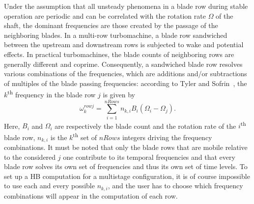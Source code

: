 Under the assumption that all unsteady phenomena in a blade row during
stable operation are periodic and can be correlated with the rotation
rate $\Omega$ of the shaft, the dominant frequencies are those created
by the passage of the neighboring blades. In a multi-row turbomachine,
a blade row sandwiched between the upstream and downstream rows is
subjected to wake and potential effects. In practical turbomachines,
the blade counts of neighboring rows are generally different and
coprime. Consequently, a sandwiched blade row resolves various
combinations of the frequencies, which are additions and/or
subtractions of multiples of the blade passing frequencies: according
to Tyler and Sofrin~\cite{Tyler1962}, the $k$\textsuperscript{th}
frequency in the blade row $j$ is given by
\begin{equation}
  \omega_k^{rowj} = \sum_{i=1}^{nRows} n_{k,i}B_i(\Omega_i-\Omega_j).
   \label{eq:calcFreq}
\end{equation}
Here, $B_i$ and $\Omega_i$ are respectively the blade count and the
rotation rate of the $i$\textsuperscript{th} blade row, $n_{k,i}$
is the $k$\textsuperscript{th} set of $nRows$ integers driving the frequency combinations. It must
be noted that only the blade rows that are mobile relative to the
considered $j$ one contribute to its temporal frequencies and that
every blade row solves its own set of frequencies and thus its own set
of time levels.  To set up a HB computation for a multistage
configuration, it is of course impossible to use each and every 
possible $n_{k,i}$, and the user has to choose which frequency
combinations will appear in the computation of each row.


